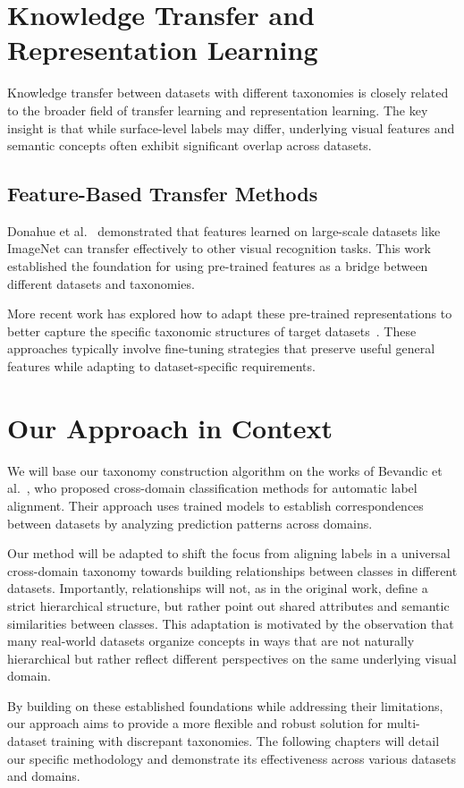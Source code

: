 \section{Knowledge Transfer and Representation Learning}

Knowledge transfer between datasets with different taxonomies is closely related to the
broader field of transfer learning and representation learning. The key insight is that
while surface-level labels may differ, underlying visual features and semantic concepts
often exhibit significant overlap across datasets.

\subsection{Feature-Based Transfer Methods}

Donahue et al.~\cite{donahue_decaf_2014} demonstrated that features learned on
large-scale datasets like ImageNet can transfer effectively to other visual recognition
tasks. This work established the foundation for using pre-trained features as a bridge
between different datasets and taxonomies.

More recent work has explored how to adapt these pre-trained representations to better
capture the specific taxonomic structures of target
datasets~\cite{kornblith_better_2019,he_rethinking_2019}.
These approaches typically involve fine-tuning strategies that preserve
useful general features while adapting to dataset-specific requirements.

\section{Our Approach in Context}

We will base our taxonomy construction algorithm on the works of Bevandic et
al.~\cite{bevandic_automatic_2022,bevandic_weakly_2024}, who proposed cross-domain
classification methods for automatic label alignment. Their approach uses trained models
to establish correspondences between datasets by analyzing prediction patterns across
domains.

Our method will be adapted to shift the focus from aligning labels in a universal
cross-domain taxonomy towards building relationships between classes in different
datasets. Importantly, relationships will not, as in the original work, define a strict
hierarchical structure, but rather point out shared attributes and semantic similarities
between classes. This adaptation is motivated by the observation that many real-world
datasets organize concepts in ways that are not naturally hierarchical but rather
reflect different perspectives on the same underlying visual domain.

By building on these established foundations while addressing their limitations, our
approach aims to provide a more flexible and robust solution for multi-dataset training
with discrepant taxonomies. The following chapters will detail our specific methodology
and demonstrate its effectiveness across various datasets and domains.
